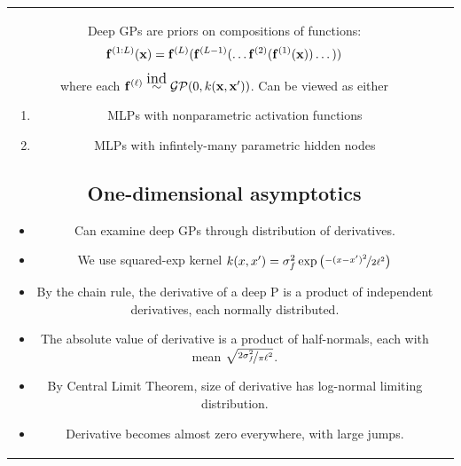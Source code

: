 \documentclass[portrait,a0b,final,a4resizeable]{include/a0poster}
\makeatletter
\newlength{\nonHumbleHeight}
\def\@humbleformat#1{{\settoheight{\nonHumbleHeight}{#1}\resizebox{!}{0.94\nonHumbleHeight}{#1}}}%
\def\humble#1{\@humbleformat{#1}}%
\newcommand{\gp}{{\humble GP}}
\newcommand{\gpt}{{\sc gp}}
\makeatother
\begin{document}
\begin{poster}
\begin{multicols}{2}



\vspace{0.5in} 

\begin{tabular}{cc}
\begin{minipage}[c]{0.73\columnwidth}

Deep GPs are priors on compositions of functions:
\begin{align*}
{\bf{f}}^{(1:L)}({\bf{x}}) = {\bf{f}}^{(L)}({\bf{f}}^{(L-1)}(\dots {\bf{f}}^{(2)}({\bf{f}}^{(1)}({\bf{x}})) \dots))
\end{align*}
%
where each $\vf^{(\ell)} \simind \GPt{0}{k(\vx, \vx')}$. 
Can be viewed as either
\begin{enumerate}
	\item  MLPs with nonparametric activation functions
    \item  MLPs with infintely-many parametric hidden nodes
\end{enumerate}




\subsection*{One-dimensional asymptotics}

\begin{itemize}
\item Can examine deep GPs through distribution of derivatives.
\item We use squared-exp kernel $k(x, x') = \sigma^2_f \exp \left( \nicefrac{-(x - x')^2}{2\ell^2} \right)
$%
\item By the chain rule, the derivative of a deep \gp{} is a product of independent derivatives, each normally distributed.
\item The absolute value of derivative is a product of half-normals, each with mean $\sqrt{\nicefrac{2 \sigma^2_f}{\pi\ell^2}}$.
\item By Central Limit Theorem, size of derivative has log-normal limiting distribution.  
\item Derivative becomes almost zero everywhere, with large jumps.
\end{itemize}


\end{minipage}
\end{tabular}
\end{multicols}
\end{poster}
\end{document}
